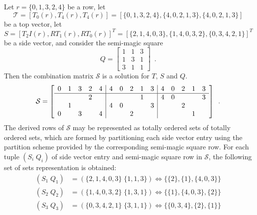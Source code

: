 \begin{example}
	Let $r = \{0, 1, 3, 2, 4\}$ be a row, let
	\begin{equation}
		\mathcal{T} = [T_0(r), T_4(r), T_4(r)] = [\{0, 1, 3, 2, 4\}, \{4, 0, 2, 1, 3\}, \{4, 0, 2, 1, 3\}]
	\end{equation}
	be a top vector, let
	\begin{equation}
		S = [T_2I(r), RT_1(r), RT_0(r)]^T = [\{2, 1, 4, 0, 3\}, \{1, 4, 0, 3, 2\}, \{0, 3, 4, 2, 1\}]^T
	\end{equation}
	be a side vector, and consider the semi-magic square
	\begin{equation}
		Q = \left[
    	\begin{array}{c|c|c}
		1 & 1 & 3 \\
		\hline
		1 & 3 & 1 \\
		\hline
		3 & 1 & 1
		\end{array}
    	\right] \enspace.
	\end{equation}
	Then the combination matrix $\mathcal{S}$ is a solution for $T$, $S$ and $Q$.
	\begin{equation}
    	\mathcal{S} = \left[
    	\begin{array}{ccccc|ccccc|ccccc}
        	0 & 1 & 3 & 2 & 4 & 4 & 0 & 2 & 1 & 3 & 4 & 0 & 2 & 1 & 3 \\
        	\hline
        	&&& 2 &&&&& 1 && 4 & 0 &&& 3 \\
        	& 1 &&&& 4 & 0 &&& 3 &&& 2 && \\
        	0 && 3 && 4 &&& 2 &&&&&& 1 &
    	\end{array}
    	\right] \enspace.
	\end{equation}
	The derived rows of $\mathcal{S}$ may be represented as totally ordered sets of totally ordered sets, which are formed by partitioning each side vector entry using the partition scheme provided by the corresponding semi-magic square row. For each tuple $(S_i \; Q_i)$ of side vector entry and semi-magic square row in $\mathcal{S}$, the following set of sets representation is obtained:
	\begin{equation}
	\begin{split}
	(S_1 \; Q_1) &= (\{2, 1, 4, 0, 3\} \; \{1, 1, 3\}) \iff \{\{2\}, \{1\}, \{4, 0, 3\}\} \\
	(S_2 \; Q_2) &= (\{1, 4, 0, 3, 2\} \; \{1, 3, 1\}) \iff \{\{1\}, \{4, 0, 3\}, \{2\}\} \\
	(S_3 \; Q_3) &= (\{0, 3, 4, 2, 1\} \; \{3, 1, 1\}) \iff \{\{0, 3, 4\}, \{2\}, \{1\}\}

\end{split}
\end{equation}
\end{example}
